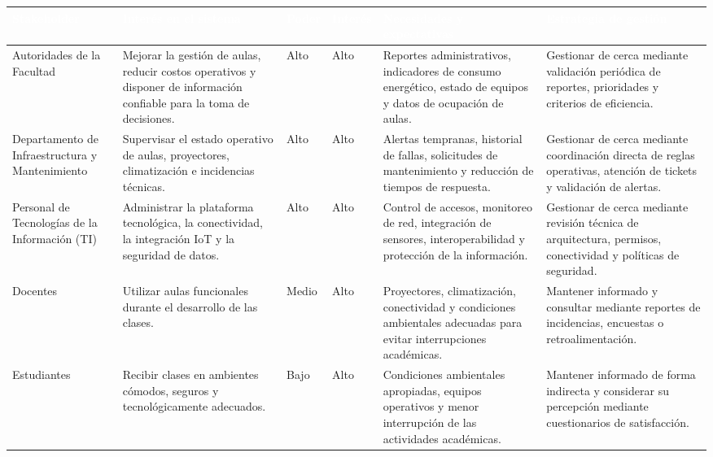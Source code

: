 \begingroup
\small
\begin{longtable}{|p{2.6cm}|p{2.6cm}|p{2.6cm}|p{2.6cm}|p{2.6cm}|p{2.6cm}|}
\hline
\cellcolor{sigagreen}\textcolor{white}{\textbf{Stakeholder}} & \cellcolor{sigagreen}\textcolor{white}{\textbf{Interés en el sistema}} & \cellcolor{sigagreen}\textcolor{white}{\textbf{Poder}} & \cellcolor{sigagreen}\textcolor{white}{\textbf{Interés}} & \cellcolor{sigagreen}\textcolor{white}{\textbf{Necesidades y expectativas}} & \cellcolor{sigagreen}\textcolor{white}{\textbf{Estrategia de gestión}} \\ \hline
Autoridades de la Facultad & Mejorar la gestión de aulas, reducir costos operativos y disponer de información confiable para la toma de decisiones. & Alto & Alto & Reportes administrativos, indicadores de consumo energético, estado de equipos y datos de ocupación de aulas. & Gestionar de cerca mediante validación periódica de reportes, prioridades y criterios de eficiencia. \\ \hline
Departamento de Infraestructura y Mantenimiento & Supervisar el estado operativo de aulas, proyectores, climatización e incidencias técnicas. & Alto & Alto & Alertas tempranas, historial de fallas, solicitudes de mantenimiento y reducción de tiempos de respuesta. & Gestionar de cerca mediante coordinación directa de reglas operativas, atención de tickets y validación de alertas. \\ \hline
Personal de Tecnologías de la Información (TI) & Administrar la plataforma tecnológica, la conectividad, la integración IoT y la seguridad de datos. & Alto & Alto & Control de accesos, monitoreo de red, integración de sensores, interoperabilidad y protección de la información. & Gestionar de cerca mediante revisión técnica de arquitectura, permisos, conectividad y políticas de seguridad. \\ \hline
Docentes & Utilizar aulas funcionales durante el desarrollo de las clases. & Medio & Alto & Proyectores, climatización, conectividad y condiciones ambientales adecuadas para evitar interrupciones académicas. & Mantener informado y consultar mediante reportes de incidencias, encuestas o retroalimentación. \\ \hline
Estudiantes & Recibir clases en ambientes cómodos, seguros y tecnológicamente adecuados. & Bajo & Alto & Condiciones ambientales apropiadas, equipos operativos y menor interrupción de las actividades académicas. & Mantener informado de forma indirecta y considerar su percepción mediante cuestionarios de satisfacción. \\ \hline

\end{longtable}
